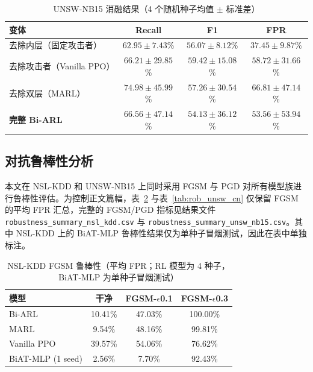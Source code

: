 \documentclass[12pt,a4paper]{ctexart}
\begin{document}
\begin{table}[H]
\centering
\caption{UNSW-NB15 消融结果（4 个随机种子均值 $\pm$ 标准差）}
\label{tab:abl_unsw_cn}
\begin{tabular}{lccc}
\toprule
\textbf{变体} & \textbf{Recall} & \textbf{F1} & \textbf{FPR} \\
\midrule
去除内层（固定攻击者）& $62.95{\pm}7.43$\% & $56.07{\pm}8.12$\% & $\mathbf{37.45{\pm}9.87}$\% \\
去除攻击者（Vanilla PPO）& $66.21{\pm}29.85$\% & $\mathbf{59.42{\pm}15.08}$\% & $58.72{\pm}31.66$\% \\
去除双层（MARL）& $\mathbf{74.98{\pm}45.99}$\% & $57.26{\pm}30.54$\% & $66.81{\pm}47.14$\% \\
\midrule
\textbf{完整 Bi-ARL} & $66.56{\pm}47.14$\% & $54.13{\pm}36.12$\% & $53.56{\pm}53.94$\% \\
\bottomrule
\end{tabular}
\end{table}

\subsection{对抗鲁棒性分析}
\label{sec:rob_cn}

本文在 NSL-KDD 和 UNSW-NB15 上同时采用 FGSM 与 PGD 对所有模型族进行鲁棒性评估。为控制正文篇幅，表~\ref{tab:rob_nsl_cn} 与表~\ref{tab:rob_unsw_cn} 仅保留 FGSM 的平均 FPR 汇总，完整的 FGSM/PGD 指标见结果文件 \texttt{robustness\_summary\_nsl\_kdd.csv} 与 \texttt{robustness\_summary\_unsw\_nb15.csv}。其中 NSL-KDD 上的 BiAT-MLP 鲁棒性结果仅为单种子冒烟测试，因此在表中单独标注。

\begin{table}[H]
\centering
\caption{NSL-KDD FGSM 鲁棒性（平均 FPR；RL 模型为 4 种子，BiAT-MLP 为单种子冒烟测试）}
\label{tab:rob_nsl_cn}
\begin{tabular}{lccc}
\toprule
\textbf{模型} & \textbf{干净} & \textbf{FGSM-$\epsilon$0.1} & \textbf{FGSM-$\epsilon$0.3} \\
\midrule
Bi-ARL        & 10.41\% & 47.03\% & 100.00\% \\
MARL          & 9.54\%  & 48.16\% & 99.81\% \\
Vanilla PPO   & 39.57\% & 54.06\% & 76.62\% \\
BiAT-MLP (1 seed) & 2.56\%  & 7.70\%  & 92.43\% \\
\bottomrule
\end{tabular}
\end{table}
\end{document}
